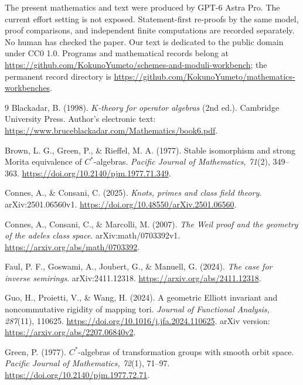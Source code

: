 \documentclass[11pt]{article}
\newcommand{\workbenchurl}{https://github.com/KokunoYumeto/schemes-and-moduli-workbench}
\newcommand{\recordurl}{https://github.com/KokunoYumeto/mathematics-workbenches}
\theoremstyle{definition}
\theoremstyle{remark}
\begin{document}
The present mathematics and text were produced by GPT-6 Astra Pro. The current effort setting is not exposed. Statement-first re-proofs by the same model, proof comparisons, and independent finite computations are recorded separately. No human has checked the paper. Our text is dedicated to the public domain under CC0 1.0. Programs and mathematical records belong at \url{\workbenchurl}; the permanent record directory is \url{\recordurl}.

\begin{thebibliography}{9}
Blackadar, B. (1998). \emph{$K$-theory for operator algebras} (2nd ed.). Cambridge University Press. Author's electronic text: \url{https://www.bruceblackadar.com/Mathematics/book6.pdf}.

Brown, L. G., Green, P., \& Rieffel, M. A. (1977). Stable isomorphism and strong Morita equivalence of $C^*$-algebras. \emph{Pacific Journal of Mathematics, 71}(2), 349--363. \url{https://doi.org/10.2140/pjm.1977.71.349}.

Connes, A., \& Consani, C. (2025). \emph{Knots, primes and class field theory}. arXiv:2501.06560v1. \url{https://doi.org/10.48550/arXiv.2501.06560}.

Connes, A., Consani, C., \& Marcolli, M. (2007). \emph{The Weil proof and the geometry of the adeles class space}. arXiv:math/0703392v1. \url{https://arxiv.org/abs/math/0703392}.

Faul, P. F., Goswami, A., Joubert, G., \& Manuell, G. (2024). \emph{The case for inverse semirings}. arXiv:2411.12318. \url{https://arxiv.org/abs/2411.12318}.

Guo, H., Proietti, V., \& Wang, H. (2024). A geometric Elliott invariant and noncommutative rigidity of mapping tori. \emph{Journal of Functional Analysis, 287}(11), 110625. \url{https://doi.org/10.1016/j.jfa.2024.110625}. arXiv version: \url{https://arxiv.org/abs/2207.06840v2}.

Green, P. (1977). $C^*$-algebras of transformation groups with smooth orbit space. \emph{Pacific Journal of Mathematics, 72}(1), 71--97. \url{https://doi.org/10.2140/pjm.1977.72.71}.
\end{thebibliography}
\end{document}
